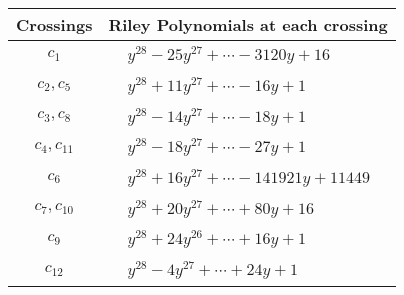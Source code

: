 \documentclass[1p]{elsarticle_modified}
\theoremstyle{definition}
\begin{document}
\begin{tabular}{m{50pt}|m{274pt}}
Crossings & \hspace{64pt}Riley Polynomials at each crossing \\
\hline $$\begin{aligned}c_{1}\end{aligned}$$&$\begin{aligned}
&y^{28}-25 y^{27}+\cdots-3120 y+16
\end{aligned}$\\
\hline $$\begin{aligned}c_{2},c_{5}\end{aligned}$$&$\begin{aligned}
&y^{28}+11 y^{27}+\cdots-16 y+1
\end{aligned}$\\
\hline $$\begin{aligned}c_{3},c_{8}\end{aligned}$$&$\begin{aligned}
&y^{28}-14 y^{27}+\cdots-18 y+1
\end{aligned}$\\
\hline $$\begin{aligned}c_{4},c_{11}\end{aligned}$$&$\begin{aligned}
&y^{28}-18 y^{27}+\cdots-27 y+1
\end{aligned}$\\
\hline $$\begin{aligned}c_{6}\end{aligned}$$&$\begin{aligned}
&y^{28}+16 y^{27}+\cdots-141921 y+11449
\end{aligned}$\\
\hline $$\begin{aligned}c_{7},c_{10}\end{aligned}$$&$\begin{aligned}
&y^{28}+20 y^{27}+\cdots+80 y+16
\end{aligned}$\\
\hline $$\begin{aligned}c_{9}\end{aligned}$$&$\begin{aligned}
&y^{28}+24 y^{26}+\cdots+16 y+1
\end{aligned}$\\
\hline $$\begin{aligned}c_{12}\end{aligned}$$&$\begin{aligned}
&y^{28}-4 y^{27}+\cdots+24 y+1
\end{aligned}$\\
\hline
\end{tabular}\\~\\
\end{document}
